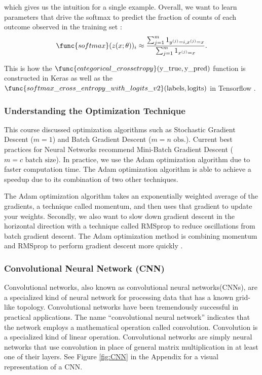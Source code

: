 \documentclass[12pt]{article}
\begin{document}
which gives us the intuition for a single example. Overall, we want to learn
parameters that drive the softmax to predict the fraction of counts of each
outcome observed in the training set \cite{Goodfellow-et-al-2016}:
\begin{equation}
  \func{softmax}(z(x;\theta))_i \approx \frac{\sum_{j=1}^m 1_{y^{(j)} = i,
      x^{(j)} = x}}{\sum_{j=1}^m 1_{x^{(j)} = x}}.
\end{equation}

This is how the $\func{categorical\_crossetropy}(\text{y\_true}, \text{y\_pred})$ function is constructed in Keras \cite{chollet2015keras} as well as the
$\func{softmax\_cross\_entropy\_with\_logits\_v2}(\text{labels}, \text{logits})$ in Tensorflow \cite{tensorflow2015-whitepaper}. 

\subsubsection{Understanding the Optimization Technique}

This course discussed optimization algorithms such as Stochastic Gradient
Descent ($m =1$) and Batch Gradient Descent ($m=n \text{ obs.}$). Current
best practices for Neural Networks recommend Mini-Batch Gradient Descent
($m = c \text{ batch size}$). In practice, we use the Adam optimization
algorithm due to faster computation time. The Adam optimization algorithm
is able to achieve a speedup due to its combination of two other techniques.

The Adam optimization algorithm takes an exponentially weighted average of
the gradients, a technique called momentum, and then uses that gradient to
update your weights. Secondly, we also want to slow down gradient descent in
the horizontal direction with a technique called RMSprop to reduce
oscillations from batch gradient descent. The Adam optimization method is
combining momentum and RMSprop to perform gradient descent more quickly
\cite{DeepLear51:online}.

\subsubsection{Convolutional Neural Network (CNN)}

Convolutional networks, also known as convolutional neural networks(CNNs),
are a specialized kind of neural network for processing data that has a
known grid-like topology. Convolutional networks have been tremendously
successful in practical applications. The name “convolutional neural network”
indicates that the network employs a mathematical operation called
convolution. Convolution is a specialized kind of linear operation.
Convolutional networks are simply neural networks that use convolution
in place of general matrix multiplication in at least one of their layers. See
Figure \ref{fig:CNN} in the Appendix for a visual representation of a CNN.
\end{document}
